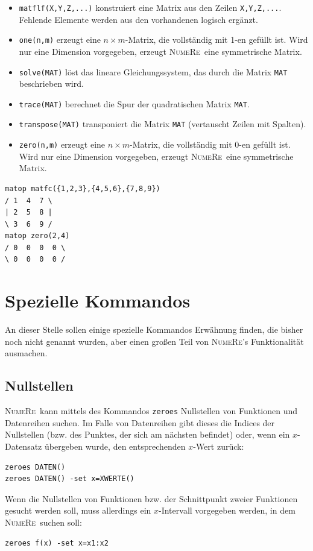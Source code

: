 \documentclass[DIV=14,headsepline,footsepline]{scrbook}
\newcommand{\NR}{\textsc{Nu\-me\-Re}}
\begin{document}
\begin{itemize}
					\item \verb+matflf(X,Y,Z,...)+ konstruiert eine Matrix aus den Zeilen \verb+X,Y,Z,...+. Fehlende Elemente werden aus den vorhandenen logisch ergänzt.
					\item \verb+one(n,m)+ erzeugt eine $n\times m$-Matrix, die vollständig mit 1-en gefüllt ist. Wird nur eine Dimension vorgegeben, erzeugt \NR\ eine symmetrische Matrix.
					\item \verb+solve(MAT)+ löst das lineare Gleichungssystem, das durch die Matrix \verb+MAT+ beschrieben wird.
					\item \verb+trace(MAT)+ berechnet die Spur der quadratischen Matrix \verb+MAT+.
					\item \verb+transpose(MAT)+ transponiert die Matrix \verb+MAT+ (vertauscht Zeilen mit Spalten).
					\item \verb+zero(n,m)+ erzeugt eine $n\times m$-Matrix, die vollständig mit 0-en gefüllt ist. Wird nur eine Dimension vorgegeben, erzeugt \NR\ eine symmetrische Matrix.
				\end{itemize}
				\begin{lstlisting}
matop matfc({1,2,3},{4,5,6},{7,8,9})
/ 1  4  7 \
| 2  5  8 |
\ 3  6  9 /
matop zero(2,4)
/ 0  0  0  0 \
\ 0  0  0  0 /
				\end{lstlisting}
		\chapter{Spezielle Kommandos}
			An dieser Stelle sollen einige spezielle Kommandos Erwähnung finden, die bisher noch nicht genannt wurden, aber einen großen Teil von \NR's Funktionalität ausmachen.
			\section{Nullstellen}
				\NR\ kann mittels des Kommandos \verb+zeroes+\cmd{zeroes} Nullstellen von Funktionen und Datenreihen suchen. Im Falle von Datenreihen gibt dieses die Indices der Nullstellen (bzw. des Punktes, der sich am nächsten befindet) oder, wenn ein $x$-Datensatz übergeben wurde, den entsprechenden $x$-Wert zurück:
				\begin{lstlisting}
zeroes DATEN()
zeroes DATEN() -set x=XWERTE()
				\end{lstlisting}
				
				Wenn die Nullstellen von Funktionen bzw. der Schnittpunkt zweier Funktionen gesucht werden soll, muss allerdings ein $x$-Intervall vorgegeben werden, in dem \NR\ suchen soll:
				\begin{lstlisting}
zeroes f(x) -set x=x1:x2
				\end{lstlisting}
				
\end{document}
